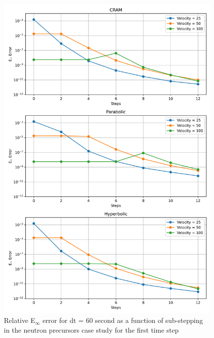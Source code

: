 \begin{figure}[p]
    \centering
    \includegraphics[width=5in]{images/chapter-5/caseStudies/neutronPrecursors/dt60/neutronPrecursorsEinfErrorerrorWithSteps.png}
    \caption{Relative E$_{\infty}$ error for dt = 60 second as a function of sub-stepping in the neutron precursors case study for the first time step}
    \label{fig:neutron_precursors_Einf_dt60_with_substeps}
\end{figure}

\clearpage

